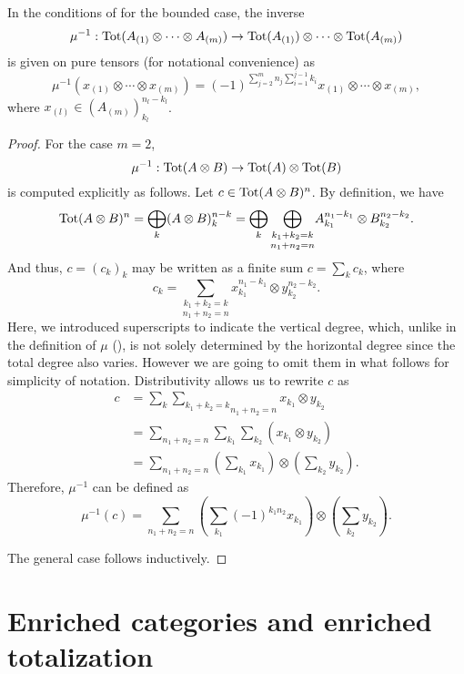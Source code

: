 \documentclass[Thesis.tex]{subfiles}
\begin{document}
\begin{lem}\label{mui}
In the conditions of  for the bounded case, the inverse
\[\mu^{-1}:\operatorname{Tot}(A_{(1)}\otimes\cdots\otimes A_{(m)})\to \operatorname{Tot}(A_{(1)})\otimes\cdots\otimes \operatorname{Tot}(A_{(m)})\]
is given on pure tensors (for notational convenience) as
\begin{equation}\label{mu}
\mu^{-1}(x_{(1)}\otimes\cdots\otimes x_{(m)})=(-1)^{\sum_{j=2}^m n_j\sum_{i=1}^{j-1}k_i}x_{(1)}\otimes\cdots\otimes x_{(m)},
\end{equation}
where $x_{(l)}\in (A_{(m)})_{k_l}^{n_l-k_l}$.
\end{lem}
\begin{proof}
For the case $m=2$,
\[\mu^{-1}:\operatorname{Tot}(A\otimes B)\to \operatorname{Tot}(A)\otimes \operatorname{Tot}(B)\]
is computed explicitly as follows.
Let  $c\in\operatorname{Tot}(A\otimes B)^n$. By definition, we have
\[\operatorname{Tot}(A\otimes B)^n=\bigoplus_k (A\otimes B)^{n-k}_k=\bigoplus_k\underset{n_1+n_2=n}{\bigoplus_{k_1+k_2=k}}A_{k_1}^{n_1-k_1}\otimes B_{k_2}^{n_2-k_2}.\]
And thus, $c=(c_k)_k$ may be written as a finite sum $c=\sum_k c_k$, where 
\[c_k=\underset{n_1+n_2=n}{\sum_{k_1+k_2=k}}x_{k_1}^{n_1-k_1}\otimes y_{k_2}^{n_2-k_2}.\]
Here, we introduced superscripts to indicate the vertical degree, which, unlike in the definition of $\mu$ (), is not solely determined by the horizontal degree since the total degree also varies. However we are going to omit them in what follows for simplicity of notation. Distributivity allows us to rewrite $c$ as
\begin{align*}
c&=\sum_k \underset{n_1+n_2=n}{\sum_{k_1+k_2=k}}x_{k_1}\otimes y_{k_2}\\&=\sum_{n_1+n_2=n}\sum_{k_1}\sum_{k_2}(x_{k_1}\otimes y_{k_2})\\
&=\sum_{n_1+n_2=n}\left(\sum_{k_1}x_{k_1}\right)\otimes\left(\sum_{k_2}y_{k_2}\right).
\end{align*}
Therefore, $\mu^{-1}$ can be defined as
\[\mu^{-1}(c)=\sum_{n_1+n_2=n}\left(\sum_{k_1}(-1)^{k_1n_2}x_{k_1}\right)\otimes\left(\sum_{k_2}y_{k_2}\right).\]

The general case follows inductively.
\end{proof}

\section{Enriched categories and enriched totalization}
\end{document}
